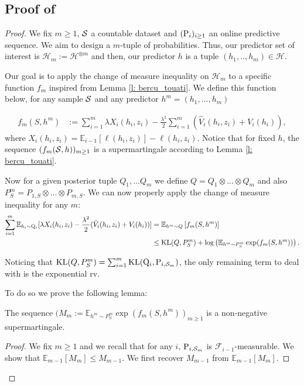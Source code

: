 \subsection{Proof of }
\label{sec: proof_main_thm_online-ht}
 \begin{proof}
   We fix $m\geq 1$, $\S$ a countable dataset and $(\P_{i})_{i\geq 1}$ an online predictive sequence. We aim to design a $m$-tuple of probabilities. Thus, our predictor set of interest is $\mathcal{H}_m:= \mathcal{H}^{\otimes m}$ and then, our predictor $h$ is a tuple $(h_1,..,h_m)\in\mathcal{H}$.

   Our goal is to apply the change of measure inequality on $\mathcal{H}_m$ to a specific function $f_m$ inspired from Lemma \ref{l: bercu_touati}. We define this function below, for any sample $\S$ and any predictor $h^m=(h_1,...,h_m)$

   \begin{align*}
   f_m(S,h^m) & := \sum_{i=1}^m \lambda X_i(h_i,z_i)  - \frac{\lambda^2}{2}\sum_{i=1}^m(\hat{V}_i(h_i,z_i) + V_i(h_i)),
   \end{align*}
   where $X_i(h_i,z_i)= \mathbb{E}_{i-1}[\ell(h_i,z_i)]- \ell(h_i,z_i)$. Notice that for fixed $h$, the sequence $(f_m(\S,h))_{m\geq 1}$ is a supermartingale according to Lemma \ref{l: bercu_touati}.

   Now for a given posterior tuple $Q_1,...Q_m$ we define $Q= Q_1 \otimes ...\otimes Q_m$ and also $P^m_S = P_{1,S}\otimes...\otimes P_{m,S}$. We can now properly apply the change of measure inequality for any $m$:
   \begin{align*}
    \sum_{i=1}^m \mathbb{E}_{h_i\sim \Q_{i}}[\lambda X_i(h_i,z_i)  - \frac{\lambda^2}{2}(\hat{V}_i(h_i,z_i) + V_i(h_i))] & = \mathbb{E}_{h^m\sim Q}\left[ f_m(S,h^m) \right] \\
    & \leq \operatorname{KL}(Q,P^m_S) + \log \left( \mathbb{E}_{h^m\sim P^m_S}\exp(f_m(S,h^m))  \right).
   \end{align*}

   Noticing that $\operatorname{KL}(Q,P^m_S)= \sum_{i=1}^m \operatorname{KL}(\Q_{i},\P_{i,\Sm})$, the only remaining term to deal with is the exponential rv.

   To do so we prove the following lemma:

   \begin{lemma}
     The sequence $(M_m:=\mathbb{E}_{h^m\sim P^m_S}\exp(f_m(S,h^m))_{m\geq 1}$ is a non-negative supermartingale.
   \end{lemma}
   \begin{proof}
   We fix $m\geq 1$ and we recall that for any $i$, $\P_{i,\Sm}$ is $\mathcal{F}_{i-1}$-measurable. We show that $\mathbb{E}_{m-1}[M_m] \leq M_{m-1}$. We first recover $M_{m-1}$ from $\mathbb{E}_{m-1}[M_m]$.


\end{proof}
\end{proof}
